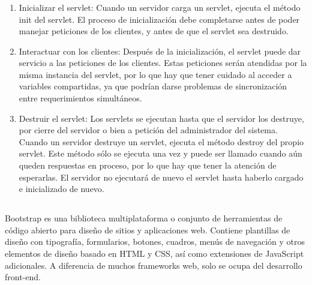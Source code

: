 \documentclass[10pt,a4paper]{article}
\begin{document}
\subsubsection{\color{colorESCOM}{Ciclo de vida}}
\begin{enumerate}
    \item Inicializar el servlet: 
Cuando un servidor carga un servlet, ejecuta el método init del servlet. El proceso de inicialización debe completarse antes de poder manejar peticiones de los clientes, y antes de que el servlet sea destruido.

    \item Interactuar con los clientes: 
Después de la inicialización, el servlet puede dar servicio a las peticiones de los clientes. Estas peticiones serán atendidas por la misma instancia del servlet, por lo que hay que tener cuidado al acceder a variables compartidas, ya que podrían darse problemas de sincronización entre requerimientos simultáneos.

    \item Destruir el servlet: 
Los servlets se ejecutan hasta que el servidor los destruye, por cierre del servidor o bien a petición del administrador del sistema. Cuando un servidor destruye un servlet, ejecuta el método destroy del propio servlet. Este método sólo se ejecuta una vez y puede ser llamado cuando aún queden respuestas en proceso, por lo que hay que tener la atención de esperarlas. El servidor no ejecutará de nuevo el servlet hasta haberlo cargado e inicializado de nuevo.
\end{enumerate}

\subsection{\color{colorESCOM}{Bootstrap}}
Bootstrap es una biblioteca multiplataforma o conjunto de herramientas de código abierto para diseño de sitios y aplicaciones web. Contiene plantillas de diseño con tipografía, formularios, botones, cuadros, menús de navegación y otros elementos de diseño basado en HTML y CSS, así como extensiones de JavaScript adicionales. A diferencia de muchos frameworks web, solo se ocupa del desarrollo front-end.
\pagebreak

\end{document}

